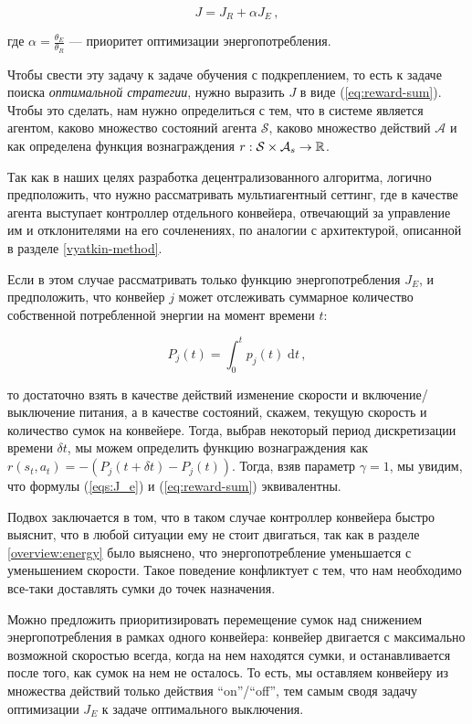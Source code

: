 \documentclass[specification,annotation,times]{itmo-student-thesis}
\theoremstyle{definition}
\begin{document}
\begin{equation}\label{eqs:J}
  J = J_R + \alpha J_E \,,
\end{equation}

где $\alpha = \frac{\theta_E}{\theta_R}$ --- приоритет оптимизации
энергопотребления.

Чтобы свести эту задачу к задаче обучения с подкреплением, то есть к задаче
поиска \textit{оптимальной стратегии}, нужно выразить $J$ в виде
(\ref{eq:reward-sum}). Чтобы это сделать, нам нужно определиться с тем, что в
системе является агентом, каково множество состояний агента $\mathcal{S}$,
каково множество действий $\mathcal{A}$ и как определена функция вознаграждения
$r : \mathcal{S} \times \mathcal{A}_s \rightarrow \Bbb{R}$.

Так как в наших целях разработка децентрализованного алгоритма, логично
предположить, что нужно рассматривать мультиагентный сеттинг, где в качестве
агента выступает контроллер отдельного конвейера, отвечающий за управление им и
отклонителями на его сочленениях, по аналогии с архитектурой, описанной в
разделе \ref{vyatkin-method}.

Если в этом случае рассматривать только функцию
энергопотребления $J_E$, и предположить, что конвейер $j$ может отслеживать
суммарное количество собственной потребленной энергии на момент времени $t$:

\begin{equation}
  P_j(t) = \int_0^t \! p_j(t) \; \mathrm{d}t \,,
\end{equation}

то достаточно взять в качестве действий изменение скорости и
включение/выключение питания, а в качестве состояний, скажем, текущую скорость и
количество сумок на конвейере. Тогда, выбрав некоторый период дискретизации
времени $\delta t$, мы можем определить функцию вознаграждения как
$r(s_t, a_t) = - (P_j(t + \delta t) - P_j(t))$. Тогда, взяв параметр
$\gamma = 1$, мы увидим, что формулы (\ref{eqs:J_e}) и (\ref{eq:reward-sum})
эквивалентны.

Подвох заключается в том, что в таком случае контроллер конвейера быстро
выяснит, что в любой ситуации ему не стоит двигаться, так как в разделе
\ref{overview:energy} было выяснено, что энергопотребление уменьшается с
уменьшением скорости. Такое поведение конфликтует с тем, что нам необходимо
все-таки доставлять сумки до точек назначения.

Можно предложить приоритизировать перемещение сумок над снижением
энергопотребления в рамках одного конвейера: конвейер двигается с максимально
возможной скоростью всегда, когда на нем находятся сумки, и останавливается
после того, как сумок на нем не осталось. То есть, мы оставляем конвейеру из
множества действий только действия ``on''/``off'', тем самым сводя задачу
оптимизации $J_E$ к задаче оптимального выключения.
\end{document}
